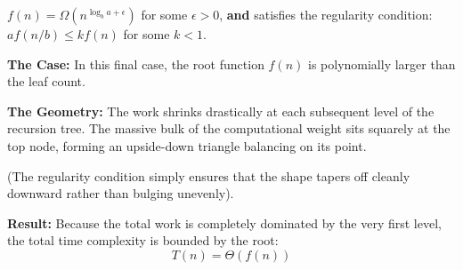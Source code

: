 \documentclass[11pt, a4paper]{article}
\begin{document}
\begin{tcolorbox}[colback=accent2!10, colframe=accent2, title=\textbf{Condition}]
$f(n) = \Omega(n^{\log_b a + \epsilon})$ for some $\epsilon > 0$, \textbf{and} satisfies the regularity condition: $a f(n/b) \le k f(n)$ for some $k < 1$.
\end{tcolorbox}

\textbf{The Case:} In this final case, the root function $f(n)$ is polynomially larger than the leaf count.

\textbf{The Geometry:}  The work shrinks drastically at each subsequent level of the recursion tree. The massive bulk of the computational weight sits squarely at the top node, forming an upside-down triangle balancing on its point. 

(The regularity condition simply ensures that the shape tapers off cleanly downward rather than bulging unevenly).

\textbf{Result:} Because the total work is completely dominated by the very first level, the total time complexity is bounded by the root:
\begin{equation*}
    T(n) = \Theta(f(n))
\end{equation*}

\vspace{0.5cm}
\begin{center}
\end{center}
\end{document}
